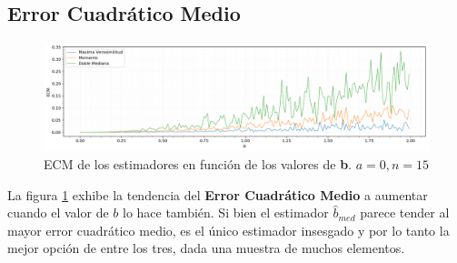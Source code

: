 \subsection{Error Cuadrático Medio}
\begin{figure}[H]
	\centering
	\includegraphics[width=1\textwidth]{imagenes/ecm.png}
	\caption{\footnotesize ECM de los estimadores en función de los valores de \textbf{b}. $a=0, n=15$}
	\label{fig:ej6-ecm}
\end{figure}

La figura \ref{fig:ej6-ecm} exhibe la tendencia del \textbf{Error Cuadrático Medio} a aumentar cuando el valor de $b$ lo hace también. Si bien el estimador $\hat{b}_{med}$ parece tender al mayor error cuadrático medio, es el único estimador insesgado y por lo tanto la mejor opción de entre los tres, dada una muestra de muchos elementos.